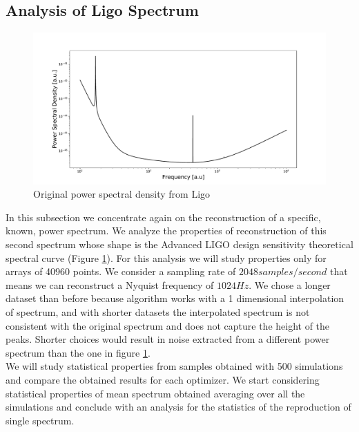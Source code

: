 \documentclass[twocolumn,showpacs,preprintnumbers,nofootinbib,prd,
superscriptaddress,10pt]{revtex4-1}
\begin{document}
\subsection{Analysis of Ligo Spectrum}
\begin{figure}
    \centering
    \includegraphics[width = \linewidth]{Images/LIGOsimulate/LigoPSDoriginal.pdf}
    \caption{Original power spectral density from Ligo}
    \label{fig:LigoPSDOriginal}
\end{figure}
In this subsection we concentrate again on the reconstruction of a specific, known, power spectrum.
We analyze the properties of reconstruction of this second spectrum whose shape is the Advanced LIGO design sensitivity theoretical spectral curve (Figure \ref{fig:LigoPSDOriginal}). 
For this analysis we will study properties only for arrays of 40960 points. We consider a sampling rate of $2048 samples / second$ that means we can reconstruct a Nyquist frequency of $1024 Hz$. We chose a longer dataset than before because algorithm works with a 1 dimensional interpolation of spectrum, and with shorter datasets the interpolated spectrum is not consistent with the original spectrum and does not capture the height of the peaks. Shorter choices would result in noise extracted from a different power spectrum than the one in figure \ref{fig:LigoPSDOriginal}. \\ 
We will study statistical properties from samples obtained with 500 simulations and compare the obtained results for each optimizer. 
We start considering statistical properties of mean spectrum obtained averaging over all the simulations and conclude with an analysis for the statistics of the reproduction of single spectrum. 
\end{document}
